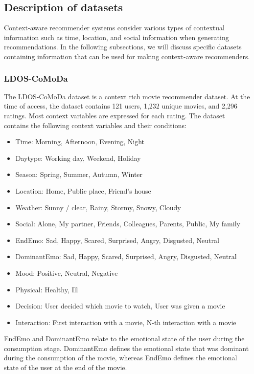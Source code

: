 \subsection{Description of datasets}\label{subsec:desc-of-datasets}
Context-aware recommender systems consider various types of contextual information such as time, location, and social information when generating recommendations\cite{aggarwal2016recommender}.
In the following subsections, we will discuss specific datasets containing information that can be used for making context-aware recommenders.

\subsubsection{LDOS-CoMoDa}\label{subsub:desc-comoda}
The LDOS-CoMoDa\cite{COMODA2013} dataset is a context rich movie recommender dataset\cite{comoda}.
At the time of access, the dataset contains 121 users, 1,232 unique movies, and 2,296 ratings.
Most context variables are expressed for each rating.
The dataset contains the following context variables and their conditions:
\begin{itemize}
    \item Time: Morning, Afternoon, Evening, Night
    \item Daytype: Working day, Weekend, Holiday
    \item Season: Spring, Summer, Autumn, Winter
    \item Location:  Home, Public place, Friend's house
    \item Weather: Sunny / clear, Rainy, Stormy, Snowy, Cloudy
    \item Social: Alone, My partner, Friends, Colleagues, Parents, Public, My family
    \item EndEmo: Sad, Happy, Scared, Surprised, Angry, Disgusted, Neutral
    \item DominantEmo: Sad, Happy, Scared, Surprised, Angry, Disgusted, Neutral
    \item Mood: Positive, Neutral, Negative
    \item Physical: Healthy, Ill
    \item Decision: User decided which movie to watch, User was given a movie
    \item Interaction: First interaction with a movie, N-th interaction with a movie
\end{itemize}
EndEmo and DominantEmo relate to the emotional state of the user during the consumption stage.
DominantEmo defines the emotional state that was dominant during the consumption of the movie, whereas EndEmo defines the emotional state of the user at the end of the movie\cite{COMODA2013}.\\
